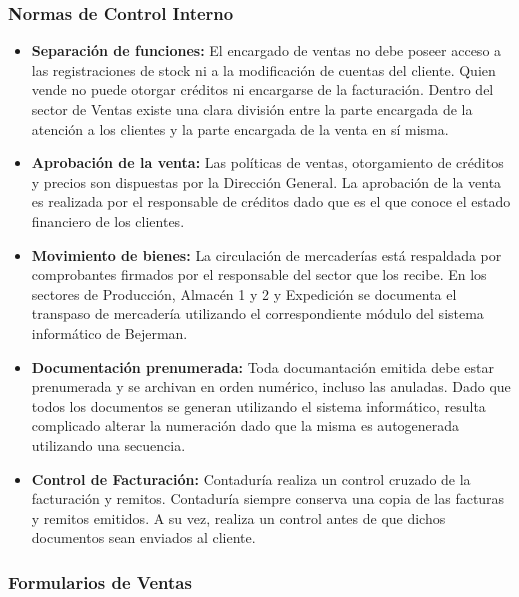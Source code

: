 \begin{description}
\end{description}

\subsubsection{Normas de Control Interno}
\begin{itemize}
 \item	{\bf Separaci\'on de funciones: } El encargado de ventas no debe poseer acceso a las registraciones de stock ni a la modificaci\'on de cuentas del cliente.
Quien vende no puede otorgar cr\'editos ni encargarse de la facturaci\'on. Dentro del sector de Ventas existe una clara divisi\'on entre la parte encargada de la atenci\'on a los clientes 
y la parte encargada de la venta en s\'i misma.
\item	{\bf Aprobaci\'on de la venta: } Las pol\'iticas de ventas, otorgamiento de cr\'editos y precios son dispuestas por la Direcci\'on General.
La aprobaci\'on de la venta es realizada por el responsable de cr\'editos dado que es el que conoce el estado financiero de los clientes.
\item	{\bf Movimiento de bienes: } La circulaci\'on de mercader\'ias est\'a respaldada por comprobantes firmados por el responsable del sector que los recibe. En los sectores de Producci\'on, 
Almac\'en 1 y 2 y Expedici\'on se documenta el transpaso de mercader\'ia utilizando el correspondiente m\'odulo del sistema inform\'atico de Bejerman.
\item	{\bf Documentaci\'on prenumerada: } Toda documantaci\'on emitida debe estar prenumerada y se archivan en orden num\'erico, incluso las anuladas. Dado que todos los documentos se generan 
utilizando el sistema inform\'atico, resulta complicado alterar la numeraci\'on dado que la misma es autogenerada utilizando una secuencia.
\item	{\bf Control de Facturaci\'on: } Contadur\'ia realiza un control cruzado de la facturaci\'on y remitos. Contadur\'ia siempre conserva una copia de las facturas y remitos emitidos. 
A su vez, realiza un control antes de que dichos documentos sean enviados al cliente.
  

\end{itemize}



\pagebreak

\subsubsection{Formularios de Ventas}


